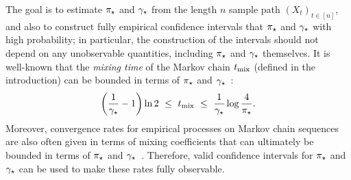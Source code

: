 The goal is to estimate $\pi_{\star}$ and $\gamma_{\star}$ from the length $n$ sample
path $(X_t)_{t \in [n]}$, and also to construct fully empirical
confidence intervals that $\pi_{\star}$ and $\gamma_{\star}$ with high probability;
in particular, the construction of the intervals should not depend on
any unobservable quantities, including $\pi_{\star}$ and $\gamma_{\star}$ themselves.
It is well-known that the \emph{mixing time} of the Markov chain $t_{\operatorname{mix}}$ (defined in the introduction)
\hide{,
\[
  \tmix
  :=
  \min\Braces{
    t \in \bbN :
    \sup_{\vq \in \Delta^{d-1}}
    \Norm{
      \vq \vP^t - \vpi
    }_{\tv} \leq 1/4
  }
  ,
\]}
can be bounded in terms of $\pi_{\star}$ and $\gamma_{\star}$~\citep[Theorems~12.3
and~12.4]{LePeWi08}:
\[
  \left(\frac1{\gamma_{\star}} - 1\right) \ln2
  \ \leq \ t_{\operatorname{mix}}
  \ \leq \ \frac1{\gamma_{\star}} \log \frac4{\pi_{\star}}
  .
\]
Moreover, convergence rates for empirical processes on Markov chain
sequences are also often given in terms of mixing coefficients that
can ultimately be bounded in terms of $\pi_{\star}$ and
$\gamma_{\star}$~\citep[e.g.,][]{MR1921877,MoRo08,MoRo09}. 
Therefore, valid confidence intervals for $\pi_{\star}$ and $\gamma_{\star}$ can be
used to make these rates fully observable.

%
%

